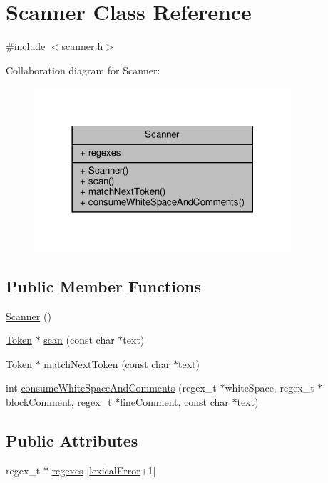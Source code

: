 \hypertarget{classScanner}{\section{Scanner Class Reference}
\label{classScanner}
}


{\ttfamily \#include $<$scanner.\-h$>$}



Collaboration diagram for Scanner\-:\nopagebreak
\begin{figure}[H]
\begin{center}
\leavevmode
\includegraphics[width=270pt]{classScanner__coll__graph}
\end{center}
\end{figure}
\subsection*{Public Member Functions}
\begin{DoxyCompactItemize}
\item 
\hyperlink{classScanner_acc995a4b67a10d2652ce00afed14f497}{Scanner} ()
\item 
\hyperlink{classToken}{Token} $\ast$ \hyperlink{classScanner_a40f021dac0075b146272e42d425b2ba5}{scan} (const char $\ast$text)
\item 
\hyperlink{classToken}{Token} $\ast$ \hyperlink{classScanner_ae085962cf00bc5eb5cc34ff591c7acd2}{match\-Next\-Token} (const char $\ast$text)
\item 
int \hyperlink{classScanner_a04bdb5e946b78e8f71d24c7866cbc850}{consume\-White\-Space\-And\-Comments} (regex\-\_\-t $\ast$white\-Space, regex\-\_\-t $\ast$block\-Comment, regex\-\_\-t $\ast$line\-Comment, const char $\ast$text)
\end{DoxyCompactItemize}
\subsection*{Public Attributes}
\begin{DoxyCompactItemize}
\item 
regex\-\_\-t $\ast$ \hyperlink{classScanner_ae191d1d2c5a19bac9e921703fb3a49e5}{regexes} \mbox{[}\hyperlink{scanner_8h_a0b165111126f48bfc565f4a66b4ce940a6f865e67a0d986c1adb1da33aa735028}{lexical\-Error}+1\mbox{]}
\end{DoxyCompactItemize}


